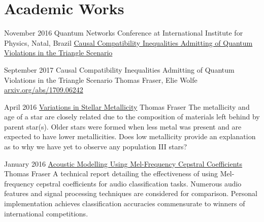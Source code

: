 \documentclass{article}
\begin{document}

    \vspace{-20pt}
    \section{Academic Works}
        {
            \begin{academiclist}
                \item{November 2016}
                {Quantum Networks Conference at International Institute for Physics, Natal, Brazil}
                {\href{https://github.com/tcfraser/tcfraser.github.io/raw/master/documents/quantum_networks_brazil_2016.pdf}{Causal Compatibility Inequalities Admitting of Quantum Violations in the Triangle Scenario}}
            \end{academiclist}
        }
        {
            \begin{paperlist}
                \item{September 2017}
                {Causal Compatibility Inequalities Admitting of Quantum Violations in the Triangle Scenario}
                {Thomas Fraser, Elie Wolfe}
                {\href{https://arxiv.org/abs/1709.06242}{arxiv.org/abs/1709.06242}}
            \end{paperlist}
        }
        \clearpage
        {
            \begin{paperlist}
                \item{April 2016}
                {\href{https://github.com/tcfraser/tcfraser.github.io/raw/master/documents/stellar_metallicity.pdf}{Variations in Stellar Metallicity}}
                {Thomas Fraser}
                {The metallicity and age of a star are closely related due to the composition of materials left behind by parent star(s). Older stars were formed when less metal was present and are expected to have lower metallicities. Does low metallicity provide an explanation as to why we have yet to observe any population III stars?}
                \item{January 2016}
                {\href{https://github.com/tcfraser/tcfraser.github.io/raw/master/documents/MFCC.pdf}{Acoustic Modelling Using Mel-Frequency Cepstral Coefficients}}
                {Thomas Fraser}
                {A technical report detailing the effectiveness of using Mel-frequency cepstral coefficients for audio classification tasks. Numerous audio features and signal processing techniques are considered for comparison. Personal implementation achieves classification accuracies commensurate to winners of international competitions.}
            \end{paperlist}
        }
\end{document}
